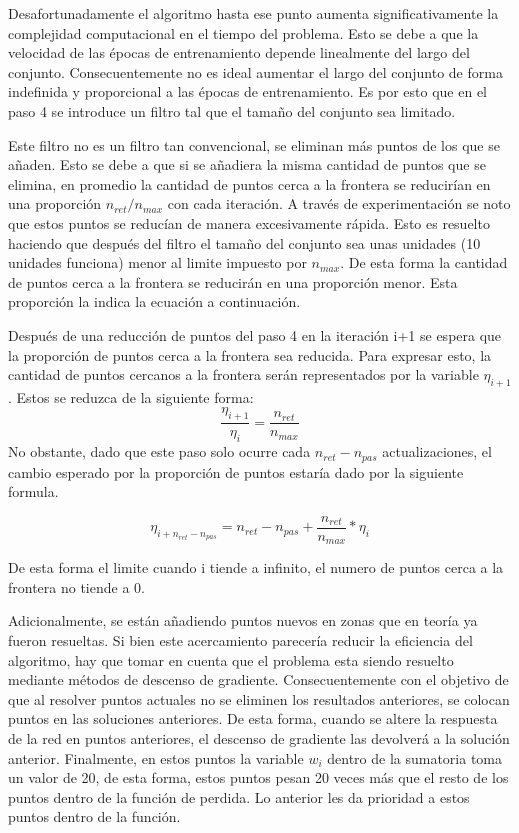 \documentclass[11pt]{article}
\begin{document}
Desafortunadamente el algoritmo hasta ese punto aumenta
significativamente la complejidad computacional en el tiempo del
problema. Esto se debe a que la velocidad de las épocas de entrenamiento
depende linealmente del largo del conjunto. Consecuentemente no es ideal
aumentar el largo del conjunto de forma indefinida y proporcional a las
épocas de entrenamiento. Es por esto que en el paso 4 se introduce un
filtro tal que el tamaño del conjunto sea limitado.

Este filtro no es un filtro tan convencional, se eliminan más puntos de
los que se añaden. Esto se debe a que si se añadiera la misma cantidad
de puntos que se elimina, en promedio la cantidad de puntos cerca a la
frontera se reducirían en una proporción \(n_{ret}/n_{max}\) con cada
iteración. A través de experimentación se noto que estos puntos se
reducían de manera excesivamente rápida. Esto es resuelto haciendo que
después del filtro el tamaño del conjunto sea unas unidades (10 unidades
funciona) menor al limite impuesto por \(n_{max}\). De esta forma la
cantidad de puntos cerca a la frontera se reducirán en una proporción
menor. Esta proporción la indica la ecuación a continuación.

Después de una reducción de puntos del paso 4 en la iteración i+1 se
espera que la proporción de puntos cerca a la frontera sea reducida.
Para expresar esto, la cantidad de puntos cercanos a la frontera serán
representados por la variable \(\eta_{i+1}\). Estos se reduzca de la
siguiente forma:
\[\frac{\eta_{i+1}}{\eta_{i}} = \frac{n_{ret}}{n_{max}}\] No obstante,
dado que este paso solo ocurre cada \(n_{ret} - n_{pas}\)
actualizaciones, el cambio esperado por la proporción de puntos estaría
dado por la siguiente formula.

\[\eta_{i+n_{ret} - n_{pas}} = n_{ret} - n_{pas} + \frac{n_{ret}}{n_{max}} * \eta_{i}\]

De esta forma el limite cuando i tiende a infinito, el numero de puntos
cerca a la frontera no tiende a 0.

Adicionalmente, se están añadiendo puntos nuevos en zonas que en teoría
ya fueron resueltas. Si bien este acercamiento parecería reducir la
eficiencia del algoritmo, hay que tomar en cuenta que el problema esta
siendo resuelto mediante métodos de descenso de gradiente.
Consecuentemente con el objetivo de que al resolver puntos actuales no
se eliminen los resultados anteriores, se colocan puntos en las
soluciones anteriores. De esta forma, cuando se altere la respuesta de
la red en puntos anteriores, el descenso de gradiente las devolverá a la
solución anterior. Finalmente, en estos puntos la variable \(w_i\)
dentro de la sumatoria toma un valor de 20, de esta forma, estos puntos
pesan 20 veces más que el resto de los puntos dentro de la función de
perdida. Lo anterior les da prioridad a estos puntos dentro de la
función.
\end{document}
